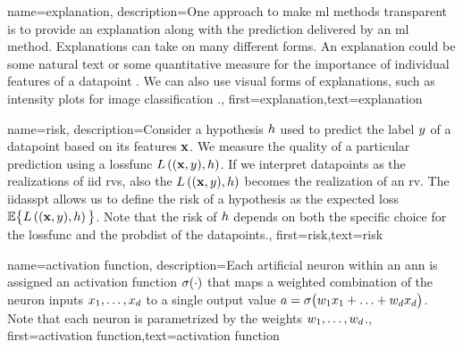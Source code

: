 {name={explanation},
	description={One approach to make \gls{ml} methods transparent is to provide an 
		explanation along with the \gls{prediction} delivered by an 
		\gls{ml} method. Explanations can take on many different forms. An explanation 
		could be some natural text or some quantitative measure for the importance 
		of individual \gls{feature}s of a \gls{datapoint} \cite{Molnar2019}. We can also 
		use visual forms of explanations, such as intensity plots for image \gls{classification} \cite{GradCamPaper}.},
	first={explanation},text={explanation} 
}

{name={risk},
	description={Consider a \gls{hypothesis} $h$ used to predict the \gls{label} 
		$y$ of a \gls{datapoint} based on its \gls{feature}s ${\bf x}$. We measure 
		the quality of a particular \gls{prediction} using a \gls{lossfunc} $L\left(({\bf x},y),h \right)$. 
		If we interpret \gls{datapoint}s as the \gls{realization}s of \gls{iid} \gls{rv}s, 
		also the $L\left(({\bf x},y),h \right)$ becomes the \gls{realization} 
		of an \gls{rv}. The \gls{iidasspt} allows us to define the risk of a \gls{hypothesis} 
		as the expected \gls{loss} $\mathbb{E} \big\{L\left(({\bf x},y),h \right) \big\}$. 
		Note that the risk of $h$ depends on both the specific choice for the \gls{lossfunc} and the 
		\gls{probdist} of the \gls{datapoint}s.},
	first={risk},text={risk} 
}

{name={activation function},
	description={Each artificial neuron within an \gls{ann} is 
		assigned an activation function $\sigma(\cdot)$ that maps a weighted combination of 
		the neuron inputs $x_{1},\ldots,x_{d}$ to a single output 
		value $a = \sigma\big(w_{1} x_{1}+\ldots+w_{d} x_{d} \big)$. 
		Note that each neuron is parametrized by the \gls{weights} $w_{1},\ldots,w_{d}$.},
first={activation function},text={activation function} 
}

